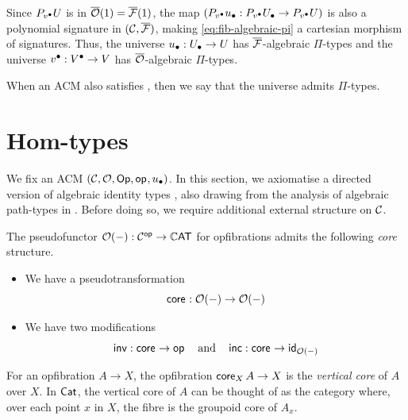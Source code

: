 Since $P_\vlow \U$ is in $\opfib(1) = \fib(1)$,
the map $(P_\vlow \ulow : P_\vlow \Ulow \to P_\vlow \U)$ is also a
polynomial signature in $(\CC,\fib)$,
making \cref{eq:fib-algebraic-pi} a cartesian morphism of signatures.
Thus, the universe $\ulow : \Ulow \to \U$ has $\fib$-algebraic $\Pi$-types 
and the universe $\vlow : \Vlow \to \V$ has $\opfib$-algebraic $\Pi$-types.

\begin{definition}\label{def:ACM-universe-pi}
  When an ACM also satisfies ,
  then we say that the universe admits $\Pi$-types.
\end{definition}

\section*{Hom-types}
We fix an ACM $(\CC,\opfibcart,\Op,\vOp,\ulow)$.
In this section,
we axiomatise a directed version of algebraic identity types
\cite{awodey2018, awodey2025},
also drawing from the analysis of algebraic path-types in
\cite{awodey2026}.
Before doing so,
we require additional external structure on $\CC$.

\begin{axiom} \label{ax:core}
  The pseudofunctor $\opfibcart(-) : \CC^\op \to \tCat$
  for opfibrations admits the following \emph{core} structure.
  \begin{itemize}
  \item We have a pseudotransformation
    \[\vCore{} : \opfibcart(-) \to \opfibcart(-)\]
  \item We have two modifications
    \[ \inv : \vCore{} \to \vOp{}
    \quad \text{and} \quad
    \inc : \vCore{} \to \id_{\opfibcart(-)} \]
  \end{itemize}
\end{axiom}
For an opfibration $A \to X$,
the opfibration $\vCore[X]{A} \to X$
is the \emph{vertical core} of $A$ over $X$.
In $\Cat$, the vertical core of $A$ can be thought of as
the category where,
over each point $x$ in $X$,
the fibre is the groupoid core of $A_x$.

